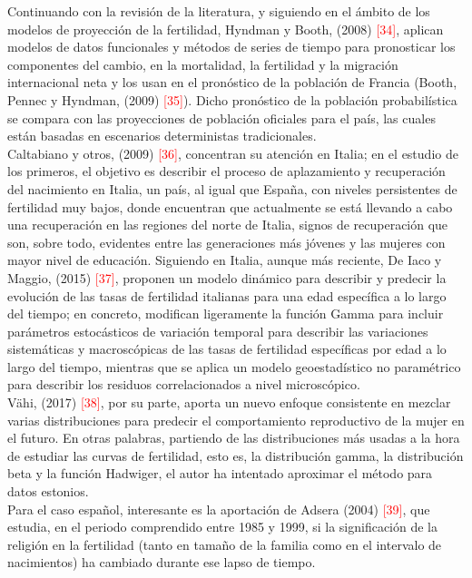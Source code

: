 Continuando con la revisión de la literatura, y siguiendo en el ámbito de los modelos de proyección de la fertilidad, Hyndman y Booth, (2008) \textcolor{red}{[34]}, aplican modelos de datos funcionales y métodos de series de tiempo para pronosticar los componentes del cambio, en la mortalidad, la fertilidad y la migración internacional neta y los usan en el pronóstico de la población de Francia (Booth, Pennec y Hyndman, (2009) \textcolor{red}{[35]}). Dicho pronóstico de la población probabilística se compara con las proyecciones de población oficiales para el país, las cuales están basadas en escenarios deterministas tradicionales.\\

Caltabiano y otros, (2009) \textcolor{red}{[36]}, concentran su atención en Italia; en el estudio de los primeros, el objetivo es describir el proceso de aplazamiento y recuperación del nacimiento en Italia, un país, al igual que España, con niveles persistentes de fertilidad muy bajos, donde encuentran que actualmente se está llevando a cabo una recuperación en las regiones del norte de Italia, signos de recuperación que son, sobre todo, evidentes entre las generaciones más jóvenes y las mujeres con mayor nivel de educación. Siguiendo en Italia, aunque más reciente, De Iaco y Maggio, (2015) \textcolor{red}{[37]}, proponen un modelo dinámico para describir y predecir la evolución de las tasas de fertilidad italianas para una edad específica  a lo largo del tiempo; en concreto, modifican ligeramente la función Gamma para incluir parámetros estocásticos de variación temporal para describir las variaciones sistemáticas y macroscópicas de las tasas de fertilidad específicas por edad a lo largo del tiempo, mientras que se aplica un modelo geoestadístico no paramétrico para describir los residuos correlacionados a nivel microscópico.\\

V\"ahi, (2017) \textcolor{red}{[38]}, por su parte, aporta un nuevo enfoque consistente en mezclar varias distribuciones para predecir el comportamiento reproductivo de la mujer en el futuro. En otras palabras, partiendo de las distribuciones más usadas a la hora de estudiar las curvas de fertilidad, esto es, la distribución gamma, la distribución beta y la función Hadwiger, el autor ha intentado aproximar el método para datos estonios.\\

Para el caso español, interesante es la aportación de Adsera (2004) \textcolor{red}{[39]}, que estudia, en el periodo comprendido entre 1985 y 1999, si la significación de la religión en la fertilidad (tanto en tamaño de la familia como en el intervalo de nacimientos) ha cambiado durante ese lapso de tiempo.\\

